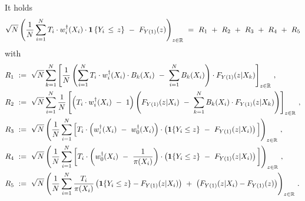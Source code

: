 \newpage
\begin{lemma}
  \label{aa:mean:lemma_decomp}
  It holds
  \begin{gather}
    \sqrt{N}
    \left( 
  \frac{1}{N}
    \sum_{i=1}^{N} 
    T_i
    \cdot
    w_i^\dagger(X_i)
    \cdot
    \mathbf{1}
    \left\{ Y_i\,\le\, z \right\}
    \ 
    -
    \ 
    F_{Y(1)}(z)
    \right)
    _{z\in\R}
    \ 
    =
    \ 
    R_1
    \ 
    +
    \ 
    R_2
    \ 
    +
    \ 
    R_3
    \ 
    +
    \ 
    R_4
    \ 
    +
    \ 
    R_5
  \end{gather}
  with
\begin{align*}
  R_1
  &
  \ 
  :=
  \ 
  \sqrt{N}
  \sum_{k=1}^{N} 
  \left[ 
  \frac{1}{N}
  \left( 
    \sum_{i=1}^{N} 
    T_i
    \cdot
    w^\dagger_i(X_i)
    \cdot
    B_k(X_i)
    \ 
    -
    \ 
    \sum_{i=1}^{N} 
    B_k(X_i)
  \right)
  \cdot
  F_{Y(1)}(z|X_k)
  \right]
  _{z\in\R}
  \,,
  \\
  R_2
  &
  \
  :=
  \ 
  \sqrt{N}
    \sum_{i=1}^{N} 
    \frac{1}{N}
    \left[ 
      \left( 
    T_i\cdot w^\dagger_i(X_i) 
    \ 
    -
    \ 
    1 
      \right)
    \left( 
  F_{Y(1)}(z|X_i)
    \ 
    -
    \ 
    \sum_{k=1}^{N} 
    B_k(X_i)
    \cdot
  F_{Y(1)}(z|X_k)
    \right)
    \right]
  _{z\in\R}
  \,,
\\
  R_3
  &
  \
  :=
  \ 
  \sqrt{N}
  \left( 
  \frac{1}{N}
    \sum_{i=1}^{N} 
    \left[ 
    T_i
    \cdot
    \left( 
    w^\dagger_i(X_i) 
    \ 
    -
    \ 
    w^\dagger_0(X_i) 
    \right)
    \cdot
    \left( 
    \mathbf{1}{\left\{ Y_i \le z \right\}}
    \ 
    -
    \ 
  F_{Y(1)}(z|X_i)
    \right)
    \,
    \right]
  \right)
  _{z\in\R}
  \,,
  \\
  R_4
  &
  \
  :=
  \ 
  \sqrt{N}
  \left( 
  \frac{1}{N}
    \sum_{i=1}^{N} 
    \left[ 
    T_i
    \cdot
    \left( 
    w^\dagger_0(X_i) 
    \ 
    -
    \ 
    \frac{1}{\pi(X_i)}
    \right)
    \cdot
    \left( 
    \mathbf{1}{\left\{ Y_i \le z \right\}}
    \ 
    -
    \ 
  F_{Y(1)}(z|X_i)
    \right)
    \,
    \right]
  \right)
  _{z\in\R}
  \,,
  \\
  R_5
  &
  \
  :=
  \ 
  \sqrt{N}
  \left( 
  \frac{1}{N}
    \sum_{i=1}^{N} 
    \frac{T_i}{\pi(X_i)}
    \left( 
    \mathbf{1}{\left\{ Y_i \le z \right\}}
    -
  F_{Y(1)}(z|X_i)
    \right)
    \ 
    +
    \ 
    \left( 
  F_{Y(1)}(z|X_i)
    -
  F_{Y(1)}(z)
    \right)
  \right)
  _{z\in\R}
  \,.
  \end{align*}
\end{lemma}
